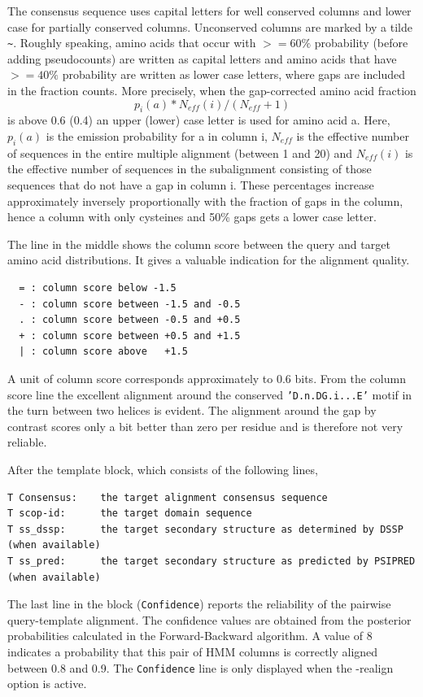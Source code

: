 \documentclass[11pt,a4paper]{article}
\begin{document}
The consensus sequence uses capital letters for well conserved columns and
lower case for partially conserved columns. Unconserved columns are marked by 
a tilde \verb`~`. Roughly speaking, amino acids that occur with $>=60\%$ probability 
(before adding pseudocounts) are written as capital letters and amino acids that have 
$>=40\%$ probability are written as lower case letters, where gaps are included
in the fraction counts. More precisely, when the gap-corrected amino acid fraction
    \[p_i(a)*N_{eff}(i)/(N_{eff}+1)\]
is above 0.6 (0.4) an upper (lower) case letter is used for amino acid a.
Here, $p_i(a)$ is the emission probability for a in column i, $N_{eff}$ is the effective 
number of sequences in the entire multiple alignment (between 1 and 20) and $N_{eff}(i)$ is 
the effective number of sequences in the subalignment consisting of those sequences
that do not have a gap in column i. These percentages increase
approximately inversely proportionally with the fraction of gaps in the column, 
hence a column with only cysteines and 50\% gaps gets a lower case letter.
              
The line in the middle shows the column score between the query and target 
amino acid distributions. It gives a valuable indication for the alignment quality.
\small
\begin{verbatim}
  = : column score below -1.5
  - : column score between -1.5 and -0.5
  . : column score between -0.5 and +0.5
  + : column score between +0.5 and +1.5
  | : column score above   +1.5
\end{verbatim}\normalsize

A unit of column score corresponds approximately to 0.6 bits.
From the column score line the excellent alignment around the conserved 
{\tt 'D.n.DG.i...E'} motif in the turn between two helices is evident. The alignment around the 
gap by contrast scores only a bit better than zero per residue and is
therefore not very reliable.

After the template block, which consists of the following lines, 
\small 
\begin{verbatim}
T Consensus:    the target alignment consensus sequence
T scop-id:      the target domain sequence
T ss_dssp:      the target secondary structure as determined by DSSP (when available)
T ss_pred:      the target secondary structure as predicted by PSIPRED (when available)
\end{verbatim}\normalsize

The last line in the block ({\tt Confidence}) reports the reliability of the pairwise 
query-template alignment. The confidence values are obtained from the posterior 
probabilities calculated in the Forward-Backward algorithm. A value of 8 indicates
a probability that this pair of HMM columns is correctly aligned between 0.8 and 0.9. 
The {\tt Confidence} line is only displayed when the -realign option is active.
\end{document}
